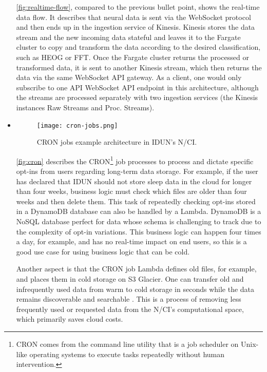 \begin{itemize}
        \autoref{fig:realtime-flow}, compared to the previous bullet point, shows the real-time data flow. It describes that neural data is sent via the WebSocket protocol and then ends up in the ingestion service of Kinesis. Kinesis stores the data stream and the new incoming data stateful and leaves it to the Fargate cluster to copy and transform the data according to the desired classification, such as HEOG or FFT. Once the Fargate cluster returns the processed or transformed data, it is sent to another Kinesis stream, which then returns the data via the same WebSocket API gateway. As a client, one would only subscribe to one API WebSocket API endpoint in this architecture, although the streams are processed separately with two ingestion services (the Kinesis instances Raw Streams and Proc. Streams).

  \item \begin{figure}[!ht]
          \centering
          \hspace*{0.4in}
          \texttt{[image: cron-jobs.png]}
          \caption{CRON jobs example architecture in IDUN’s N/CI.}
          \label{fig:cron}
        \end{figure}

        \autoref{fig:cron} describes the CRON\footnote{CRON comes from the command line utility that is a job scheduler on Unix-like operating systems to execute tasks repeatedly without human intervention.} job processes to process and dictate specific opt-ins from users regarding long-term data storage. For example, if the user has declared that IDUN should not store sleep data in the cloud for longer than four weeks, business logic must check which files are older than four weeks and then delete them. This task of repeatedly checking opt-ins stored in a DynamoDB database can also be handled by a Lambda. DynamoDB is a NoSQL database perfect for data whose schema is challenging to track due to the complexity of opt-in variations. This business logic can happen four times a day, for example, and has no real-time impact on end users, so this is a good use case for using business logic that can be cold.

        Another aspect is that the CRON job Lambda defines old files, for example, and places them in cold storage on S3 Glacier. One can transfer old and infrequently used data from warm to cold storage in seconds while the data remains discoverable and searchable \citep{sayed_introducing_2021}. This is a process of removing less frequently used or requested data from the N/CI’s computational space, which primarily saves cloud costs.
        

\end{itemize}
